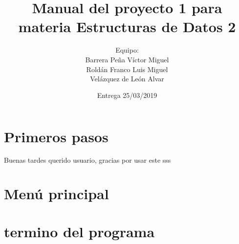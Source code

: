 \documentclass{report}
\title{Manual del proyecto 1 para materia Estructuras de Datos 2}
\author{
	Equipo:\\
	Barrera Peña Víctor Miguel \\
	Roldán Franco Luis Miguel \\
	Velázquez de León Alvar 
}
\date{Entrega 25/03/2019}
\begin{document}
	\maketitle
	\chapter{Primeros pasos}
	Buenas tardes querido usuario, gracias por usar este 
	sss
	
	\chapter{Menú principal}
	\chapter{termino del programa}
\end{document}
